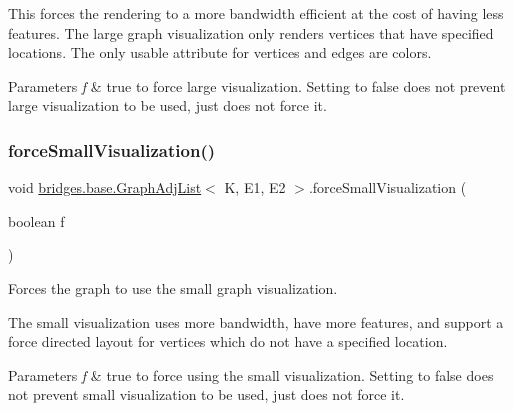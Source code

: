 This forces the rendering to a more bandwidth efficient at the cost of having less features. The large graph visualization only renders vertices that have specified locations. The only usable attribute for vertices and edges are colors.


\begin{DoxyParams}{Parameters}
{\em f} & true to force large visualization. Setting to false does not prevent large visualization to be used, just does not force it. \\
\hline
\end{DoxyParams}
\mbox{\label{classbridges_1_1base_1_1_graph_adj_list_ae14e51214742db0c4dab26c1d409f4ed}} 
\subsubsection{\texorpdfstring{force\+Small\+Visualization()}{forceSmallVisualization()}}
{\footnotesize\ttfamily void \hyperlink{classbridges_1_1base_1_1_graph_adj_list}{bridges.\+base.\+Graph\+Adj\+List}$<$ K, E1, E2 $>$.force\+Small\+Visualization (\begin{DoxyParamCaption}\item[{boolean}]{f }\end{DoxyParamCaption})}



Forces the graph to use the small graph visualization. 

The small visualization uses more bandwidth, have more features, and support a force directed layout for vertices which do not have a specified location.


\begin{DoxyParams}{Parameters}
{\em f} & true to force using the small visualization. Setting to false does not prevent small visualization to be used, just does not force it. \\
\hline
\end{DoxyParams}
\mbox{\label{classbridges_1_1base_1_1_graph_adj_list_a77771e356aa8bf44525be9ae01603989}} 
